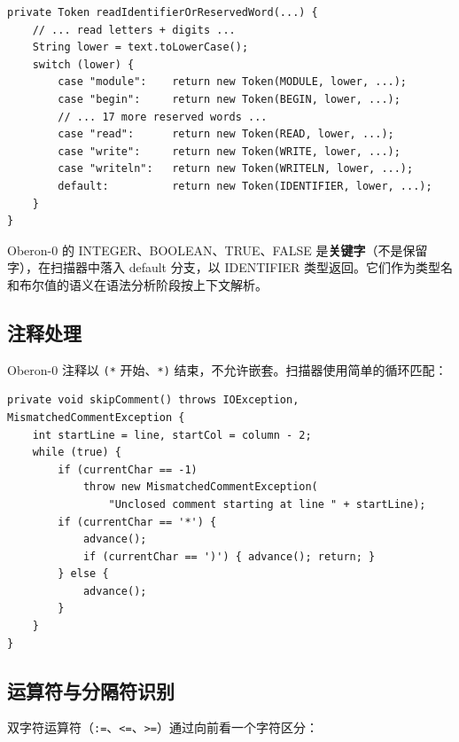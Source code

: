 \documentclass[12pt,a4paper,fontset=none]{ctexart}
\begin{document}
\begin{lstlisting}[style=javacode,caption={保留字查表（19 个保留字 + 3 个预定义过程）}]
private Token readIdentifierOrReservedWord(...) {
    // ... read letters + digits ...
    String lower = text.toLowerCase();
    switch (lower) {
        case "module":    return new Token(MODULE, lower, ...);
        case "begin":     return new Token(BEGIN, lower, ...);
        // ... 17 more reserved words ...
        case "read":      return new Token(READ, lower, ...);
        case "write":     return new Token(WRITE, lower, ...);
        case "writeln":   return new Token(WRITELN, lower, ...);
        default:          return new Token(IDENTIFIER, lower, ...);
    }
}
\end{lstlisting}

\begin{keypointBox}
Oberon-0 的 INTEGER、BOOLEAN、TRUE、FALSE 是\textbf{关键字}（不是保留字），在扫描器中落入 default 分支，以 IDENTIFIER 类型返回。它们作为类型名和布尔值的语义在语法分析阶段按上下文解析。
\end{keypointBox}

\subsection{注释处理}

Oberon-0 注释以 \texttt{(*} 开始、\texttt{*)} 结束，不允许嵌套。扫描器使用简单的循环匹配：

\begin{lstlisting}[style=javacode,caption={注释扫描核心逻辑}]
private void skipComment() throws IOException, MismatchedCommentException {
    int startLine = line, startCol = column - 2;
    while (true) {
        if (currentChar == -1)
            throw new MismatchedCommentException(
                "Unclosed comment starting at line " + startLine);
        if (currentChar == '*') {
            advance();
            if (currentChar == ')') { advance(); return; }
        } else {
            advance();
        }
    }
}
\end{lstlisting}

\subsection{运算符与分隔符识别}

双字符运算符（\texttt{:=}、\texttt{<=}、\texttt{>=}）通过向前看一个字符区分：
\end{document}
